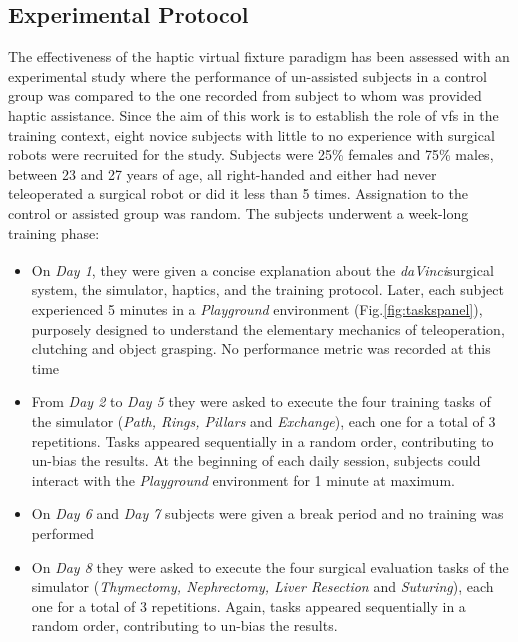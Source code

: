 \documentclass{article}
\newcommand{\cright}{\textsuperscript{\textregistered}\phantom{..}}
\begin{document}
\begin{multicols}{2}
\subsection{Experimental Protocol}
The effectiveness of the haptic virtual fixture paradigm has been assessed with an experimental study where the performance of un-assisted subjects in a control group was compared to the one recorded from subject to whom was provided haptic assistance. Since the aim of this work is to establish the role of \acp{vf} in the training context, eight novice subjects with little to no experience with surgical robots were recruited for the study. Subjects were 25\% females and 75\% males, between 23 and 27 years of age, all right-handed and either had never teleoperated a surgical robot or did it less than 5 times. Assignation to the control or assisted group was random.
\newline
The subjects underwent a week-long training phase:
\begin{itemize}
  \item On \textit{Day 1}, they were given a concise explanation about the \textit{daVinci}\cright surgical system, the simulator, haptics, and the training protocol. Later, each subject experienced 5 minutes in a \textit{Playground} environment (Fig.\ref{fig:taskspanel}), purposely designed to understand the elementary mechanics of teleoperation, clutching and object grasping. No performance metric was recorded at this time
  \item From \textit{Day 2} to \textit{Day 5} they were asked to execute the four training tasks of the simulator (\textit{Path, Rings, Pillars} and \textit{Exchange}), each one for a total of 3 repetitions. Tasks appeared sequentially in a random order, contributing to un-bias the results. At the beginning of each daily session, subjects could interact with the \textit{Playground} environment for 1 minute at maximum.
  \item On \textit{Day 6} and \textit{Day 7} subjects were given a break period and no training was performed
  \item On \textit{Day 8} they were asked to execute the four surgical evaluation tasks of the simulator (\textit{Thymectomy, Nephrectomy, Liver Resection} and \textit{Suturing}), each one for a total of 3 repetitions. Again, tasks appeared sequentially in a random order, contributing to un-bias the results.
\end{itemize}

\end{multicols}
\end{document}
